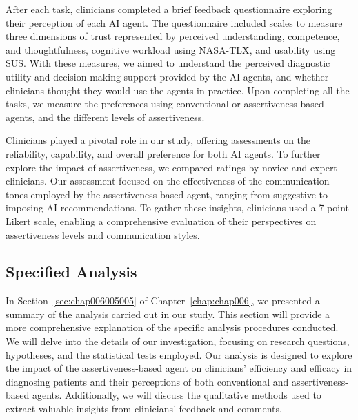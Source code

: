 After each task, clinicians completed a brief feedback questionnaire exploring their perception of each \ac{AI} agent.
The questionnaire included scales to measure three dimensions of trust represented by perceived understanding, competence, and thoughtfulness, cognitive workload using \ac{NASA-TLX}, and usability using \ac{SUS}.
With these measures, we aimed to understand the perceived diagnostic utility and decision-making support provided by the \ac{AI} agents, and whether clinicians thought they would use the agents in practice.
Upon completing all the tasks, we measure the preferences using conventional or assertiveness-based agents, and the different levels of assertiveness.

\textcolor{revised}{Clinicians played a pivotal role in our study, offering assessments on the reliability, capability, and overall preference for both \ac{AI} agents.
To further explore the impact of assertiveness, we compared ratings by novice and expert clinicians.
Our assessment focused on the effectiveness of the communication tones employed by the assertiveness-based agent, ranging from suggestive to imposing \ac{AI} recommendations.
To gather these insights, clinicians used a 7-point Likert scale, enabling a comprehensive evaluation of their perspectives on assertiveness levels and communication styles.}

\subsection{Specified Analysis}
\label{sec:app005006005}

\textcolor{revised}{In Section~\ref{sec:chap006005005} of Chapter~\ref{chap:chap006}, we presented a summary of the analysis carried out in our study.
This section will provide a more comprehensive explanation of the specific analysis procedures conducted.
We will delve into the details of our investigation, focusing on research questions, hypotheses, and the statistical tests employed.
Our analysis is designed to explore the impact of the assertiveness-based agent on clinicians' efficiency and efficacy in diagnosing patients and their perceptions of both conventional and assertiveness-based agents.
Additionally, we will discuss the qualitative methods used to extract valuable insights from clinicians' feedback and comments.}

